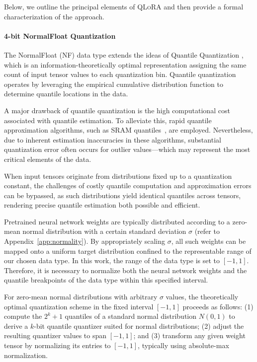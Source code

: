 Below, we outline the principal elements of \textsc{QLoRA} and then provide a formal characterization of the approach.

\paragraph{4-bit NormalFloat Quantization} The NormalFloat (NF) data type extends the ideas of Quantile Quantization \citep{dettmers2022optimizers}, which is an information-theoretically optimal representation assigning the same count of input tensor values to each quantization bin. Quantile quantization operates by leveraging the empirical cumulative distribution function to determine quantile locations in the data.

A major drawback of quantile quantization is the high computational cost associated with quantile estimation. To alleviate this, rapid quantile approximation algorithms, such as SRAM quantiles~\citep{dettmers2022optimizers}, are employed. Nevertheless, due to inherent estimation inaccuracies in these algorithms, substantial quantization error often occurs for outlier values—which may represent the most critical elements of the data.

When input tensors originate from distributions fixed up to a quantization constant, the challenges of costly quantile computation and approximation errors can be bypassed, as such distributions yield identical quantiles across tensors, rendering precise quantile estimation both possible and efficient.

Pretrained neural network weights are typically distributed according to a zero-mean normal distribution with a certain standard deviation $\sigma$ (refer to Appendix~\ref{app:normality}). By appropriately scaling $\sigma$, all such weights can be mapped onto a uniform target distribution confined to the representable range of our chosen data type. In this work, the range of the data type is set to $[-1, 1]$. Therefore, it is necessary to normalize both the neural network weights and the quantile breakpoints of the data type within this specified interval.

For zero-mean normal distributions with arbitrary $\sigma$ values, the theoretically optimal quantization scheme in the fixed interval $[-1, 1]$ proceeds as follows: (1) compute the $2^k+1$ quantiles of a standard normal distribution $N(0, 1)$ to derive a $k$-bit quantile quantizer suited for normal distributions; (2) adjust the resulting quantizer values to span $[-1, 1]$; and (3) transform any given weight tensor by normalizing its entries to $[-1, 1]$, typically using absolute-max normalization. 

